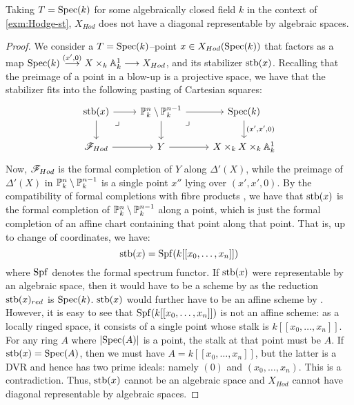 \documentclass[11pt]{amsart}
\begin{document}
\begin{prop}\label{prop:Hodge-st-diag-non-rep}
Taking $T = \mathrm{Spec}(k)$ for some algebraically closed field $k$ in the
context of \cref{exm:Hodge-st},
$X_{Hod}$ does not have a diagonal representable
by algebraic spaces.
\end{prop}
\begin{proof}
We consider a $T= \mathrm{Spec}(k)$--point
$x \in X_{Hod}(\mathrm{Spec}(k))$ that factors as a map
$\Spec(k) \to[{(x', 0)}] X \times_k \bA^1_k \to X_{Hod}$,
and its stabilizer $\mathrm{stb}(x)$. Recalling that the preimage of a point in a
blow-up is a projective space, we have that the stabilizer
fits into the following pasting of Cartesian squares:
\[\begin{tikzcd}
\stb(x) \ar[r] \ar[d] \ar[rd, phantom, "\lrcorner" very near start] &
\bP^n_k \setminus \bP^{n - 1}_k \ar[r] \ar[d]
  \ar[rd, phantom, "\lrcorner" very near start]&
\Spec(k) \ar[d, "{(x', x', 0)}"] \\
\sF_{Hod} \ar[r] & Y \ar[r] & X \times_k X \times_k \bA^1_k
\end{tikzcd}\]
Now, $\mathscr{F}_{Hod}$ is the formal completion of $Y$ along $\Delta'(X)$, while
the preimage of $\Delta'(X)$ in $\mathbb{P}^n_k \setminus \mathbb{P}^{n - 1}_k$
is a single point $x''$ lying over $(x', x', 0)$. By the compatibility of
formal completions with fibre products
\cite[\href{https://stacks.math.columbia.edu/tag/0APV}{Lemma 0APV}]
{stacks-project}, we have that $\mathrm{stb}(x)$ is the formal completion
of $\mathbb{P}^{n}_k \setminus \mathbb{P}^{n - 1}_k$ along a point, which is just
the formal completion of an affine chart containing that point along that
point. That is, up to change of coordinates, we have:
\[
\mathrm{stb}(x) = \mathrm{Spf}(k[[x_0, \dots, x_n]])
\]
where $\mathrm{Spf}$ denotes the formal spectrum functor. If $\mathrm{stb}(x)$ were
representable by an algebraic space, then it would have to be a scheme
by \cite[Corollary 3.1.2]{NagataComp} as the reduction $\mathrm{stb}(x)_{red}$ is
$\mathrm{Spec}(k)$. $\mathrm{stb}(x)$ would further have to be an affine scheme by
\cite[\href{https://stacks.math.columbia.edu/tag/06AD}{Lemma 06AD}]
{stacks-project}.
However, it is easy to see that
$\mathrm{Spf}(k[[x_0, \dots, x_n]])$ is not an affine scheme: as a locally
ringed space, it consists of a single point whose stalk is
$k[[x_0, \dots, x_n]]$. For any ring $A$ where $|\mathrm{Spec}(A)|$ is a point,
the stalk at that point must be $A$. If $\mathrm{stb}(x) = \mathrm{Spec}(A)$,
then we must have $A = k[[x_0, \dots, x_n]]$, but the latter is a DVR
and hence has two prime ideals: namely $(0)$ and $(x_0, \dots, x_n)$. This is a
contradiction. Thus, $\mathrm{stb}(x)$ cannot be an algebraic space
and $X_{Hod}$ cannot have diagonal representable by algebraic spaces.
\end{proof}
\end{document}

